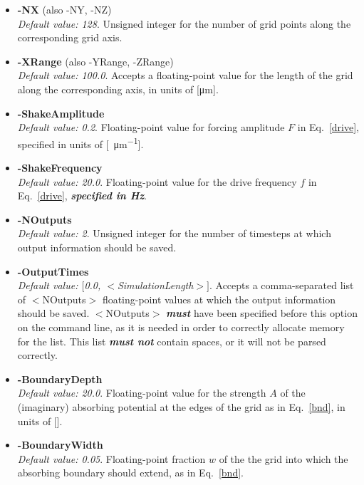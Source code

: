 \documentclass{jakedoc}
\begin{document}
\begin{itemize}
	\item \textbf{-NX} (also -NY, -NZ)\\
	\emph{Default value: 128}. Unsigned integer for the number of grid points along the corresponding grid axis.
	
	\item \textbf{-XRange} (also -YRange, -ZRange)\\
	\emph{Default value: 100.0}. Accepts a floating-point value for the length of the grid along the corresponding axis, in units of [\si{\um}]. 
	
	\item \textbf{-ShakeAmplitude}\\
	\emph{Default value: 0.2}. Floating-point value for forcing amplitude $F$ in Eq.~\eqref{drive}, specified in units of [\si{\nK\per\um}]. 
	
	\item \textbf{-ShakeFrequency}\\
	\emph{Default value: 20.0}. Floating-point value for the drive frequency $f$ in Eq.~\eqref{drive}, \textbf{\emph{specified in \si{\hertz}}}. 
	
	\item \textbf{-NOutputs}\\
	\emph{Default value: 2}. Unsigned integer for the number of timesteps at which output information should be saved. 
	
	\item \textbf{-OutputTimes}\\
	\emph{Default value: $[$0.0, $<$SimulationLength$>]$}. Accepts a comma-separated list of $<$NOutputs$>$ floating-point values at which the output information should be saved. $<$NOutputs$>$ \textbf{\emph{must}} have been specified before this option on the command line, as it is needed in order to correctly allocate memory for the list. This list \textbf{\emph{must not}} contain spaces, or it will not be parsed correctly.
	
	\item \textbf{-BoundaryDepth}\\
	\emph{Default value: \num{20.0}}. 
	Floating-point value for the strength $A$ of the (imaginary) absorbing potential at the edges of the grid as in Eq.~\eqref{bnd}, in units of [\si{\nK}]. 
	
	\item \textbf{-BoundaryWidth}\\
	\emph{Default value: \num{0.05}}. 
	Floating-point fraction $w$ of the the grid into which the absorbing boundary should extend, as in Eq.~\eqref{bnd}.
	
\end{itemize}
\end{document}
